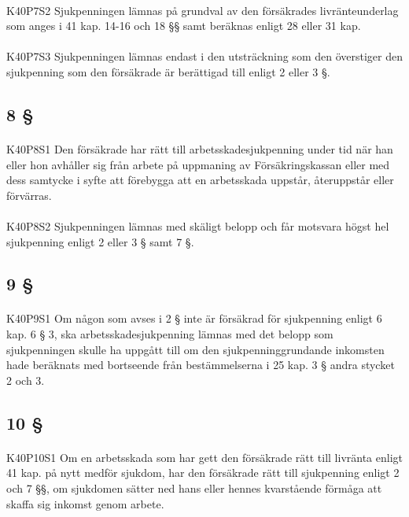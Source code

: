 \documentclass[a4paper,notitlepage,openany,10pt]{book}
\begin{document}
\paragraph*{}
{\tiny K40P7S2}
Sjukpenningen lämnas på grundval av den försäkrades livränteunderlag som anges i 41 kap. 14-16 och 18 §§ samt beräknas enligt 28 eller 31 kap.
\paragraph*{}
{\tiny K40P7S3}
Sjukpenningen lämnas endast i den utsträckning som den överstiger den sjukpenning som den försäkrade är berättigad till enligt 2 eller 3 §.
\subsection*{8 §}
\paragraph*{}
{\tiny K40P8S1}
Den försäkrade har rätt till arbetsskadesjukpenning under tid när han eller hon avhåller sig från arbete på uppmaning av Försäkringskassan eller med dess samtycke i syfte att förebygga att en arbetsskada uppstår, återuppstår eller förvärras.
\paragraph*{}
{\tiny K40P8S2}
Sjukpenningen lämnas med skäligt belopp och får motsvara högst hel sjukpenning enligt 2 eller 3 § samt 7 §.
\subsection*{9 §}
\paragraph*{}
{\tiny K40P9S1}
Om någon som avses i 2 § inte är försäkrad för sjukpenning enligt 6 kap. 6 § 3, ska arbetsskadesjukpenning lämnas med det belopp som sjukpenningen skulle ha uppgått till om den sjukpenninggrundande inkomsten hade beräknats med bortseende från bestämmelserna i 25 kap. 3 § andra stycket 2 och 3.
\subsection*{10 §}
\paragraph*{}
{\tiny K40P10S1}
Om en arbetsskada som har gett den försäkrade rätt till livränta enligt 41 kap. på nytt medför sjukdom, har den försäkrade rätt till sjukpenning enligt 2 och 7 §§, om sjukdomen sätter ned hans eller hennes kvarstående förmåga att skaffa sig inkomst genom arbete.
\end{document}
